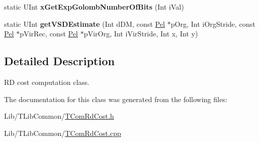 \begin{DoxyCompactItemize}
\mbox{\label{class_t_com_rd_cost_ac3d49589fe985e4c5235541f40e6f2e8}} 
static U\+Int {\bfseries x\+Get\+Exp\+Golomb\+Number\+Of\+Bits} (Int i\+Val)
\item 
\mbox{\label{class_t_com_rd_cost_a2aa58149fc667dc46353b3056997b55e}} 
static U\+Int {\bfseries get\+V\+S\+D\+Estimate} (Int d\+DM, const \hyperlink{_type_def_8h_af92141699657699b4b547be0c8517541}{Pel} $\ast$p\+Org, Int i\+Org\+Stride, const \hyperlink{_type_def_8h_af92141699657699b4b547be0c8517541}{Pel} $\ast$p\+Vir\+Rec, const \hyperlink{_type_def_8h_af92141699657699b4b547be0c8517541}{Pel} $\ast$p\+Vir\+Org, Int i\+Vir\+Stride, Int x, Int y)
\end{DoxyCompactItemize}


\subsection{Detailed Description}
RD cost computation class. 

The documentation for this class was generated from the following files\+:\begin{DoxyCompactItemize}
\item 
Lib/\+T\+Lib\+Common/\hyperlink{_t_com_rd_cost_8h}{T\+Com\+Rd\+Cost.\+h}\item 
Lib/\+T\+Lib\+Common/\hyperlink{_t_com_rd_cost_8cpp}{T\+Com\+Rd\+Cost.\+cpp}\end{DoxyCompactItemize}

